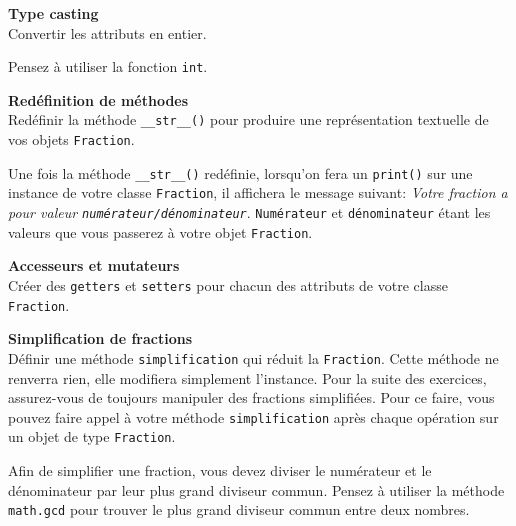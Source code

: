 \begin{Exercice}[5 minutes] \textbf{Type casting}\\
	Convertir les attributs en entier.
	\begin{conseil}
		Pensez à utiliser la fonction \lstinline{int}.
	\end{conseil}
\end{Exercice}

\begin{Exercice}[5 minutes] \textbf{Redéfinition de méthodes} \\
	Redéfinir la méthode \lstinline{__str__()} pour produire une représentation textuelle de vos objets \lstinline{Fraction}.
	\begin{conseil}
		Une fois la méthode \lstinline{__str__()} redéfinie, lorsqu'on fera un \lstinline{print()} sur une instance de votre classe \lstinline{Fraction}, il affichera le message suivant: \textit{Votre fraction a pour valeur \lstinline{numérateur/dénominateur}}. \lstinline{Numérateur} et \lstinline{dénominateur} étant les valeurs que vous passerez à votre objet \lstinline{Fraction}.
	\end{conseil}
\end{Exercice}

\begin{Exercice} [5 minutes] \textbf{Accesseurs et mutateurs} \\
	Créer des \lstinline{getters} et \lstinline{setters} pour chacun des attributs de votre classe \lstinline{Fraction}.
\end{Exercice}

\begin{Exercice} [10 minutes] \textbf{Simplification de fractions}\\
	Définir une méthode \lstinline{simplification} qui réduit la \lstinline{Fraction}. Cette méthode ne renverra rien, elle modifiera simplement l'instance. Pour la suite des exercices, assurez-vous de toujours manipuler des fractions simplifiées. Pour ce faire, vous pouvez faire appel à votre méthode \lstinline{simplification} après chaque opération sur un objet de type \lstinline{Fraction}.

	\begin{conseil}
		Afin de simplifier une fraction, vous devez diviser le numérateur et le dénominateur par leur plus grand diviseur commun. Pensez à utiliser la méthode \lstinline{math.gcd} pour trouver le plus grand diviseur commun entre deux nombres.
	\end{conseil}
\end{Exercice}


